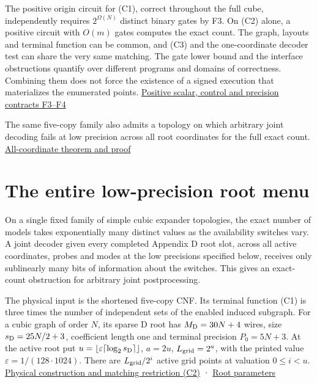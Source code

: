 \documentclass[
  11pt,
]{article}
\begin{document}
The positive origin circuit for (C1), correct throughout the full cube,
independently requires \(2^{\Omega(N)}\) distinct binary gates by F3. On
(C2) alone, a positive circuit with \(O(m)\) gates computes the exact
count. The graph, layouts and terminal function can be common, and (C3)
and the one-coordinate decoder test can share the very same matching.
The gate lower bound and the interface obstructions quantify over
different programs and domains of correctness. Combining them does not
force the existence of a signed execution that materializes the
enumerated points. \hyperref[v8-section-stronger-family]{Positive scalar,
control and precision contracts F3--F4}

The same five-copy family also admits a topology on which arbitrary
joint decoding fails at low precision across all root coordinates for
the full exact count.
\hyperref[v8-section-pooled-menu-barrier]{All-coordinate theorem and proof}

\section{The entire low-precision root
menu}\label{v8-section-pooled-menu-barrier}

On a single fixed family of simple cubic expander topologies, the exact
number of models takes exponentially many distinct values as the
availability switches vary. A joint decoder given every completed
Appendix D root slot, across all active coordinates, probes and modes at
the low precisions specified below, receives only sublinearly many bits
of information about the switches. This gives an exact-count obstruction
for arbitrary joint postprocessing.

The physical input is the shortened five-copy CNF. Its terminal function
(C1) is three times the number of independent sets of the enabled
induced subgraph. For a cubic graph of order \(N\), its sparse D root
has \(M_{\rm D}=30N+4\) wires, size \(s_{\rm D}=25N/2+3\), coefficient
length one and terminal precision \(P_0=5N+3\). At the active root put
\(u=\lfloor\varepsilon\lceil\log_2s_{\rm D}\rceil\rfloor\), \(a=2u\),
\(L_{\rm grid}=2^a\), with the printed value
\(\varepsilon=1/(128\cdot1024)\). There are \(L_{\rm grid}/2^i\) active
grid points at valuation \(0\le i<u\).
\hyperref[v8-section-common-native-family]{Physical construction and
matching restriction (C2)} ·
\href{https://github.com/openai/math/blob/main/preprints/The-Exponential-Time-Hypothesis-is-False-October-25-2026/build/quantitative-contraction.tex\#L73}{Root
parameters}
\end{document}
